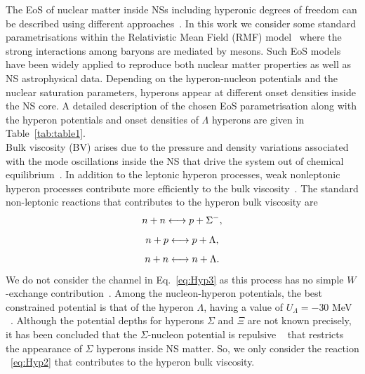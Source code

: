 \documentclass[%
 reprint,
 amsmath,amssymb,
 aps,
]{revtex4-2}
\begin{document}
 The EoS of nuclear matter inside NSs including hyperonic degrees of freedom can be described using different approaches~\cite{Chatterjee_2016,Oertel2017}. In this work we consider some standard parametrisations within the Relativistic Mean Field (RMF) model~\cite{GM91,Chen2014} where the strong interactions among baryons are mediated by mesons. Such EoS models have been widely applied to reproduce both nuclear matter properties as well as NS astrophysical data. Depending on the hyperon-nucleon potentials and the nuclear saturation parameters, hyperons appear at different onset densities inside the NS core. A detailed description of the chosen EoS parametrisation along with the hyperon potentials and onset densities of $\Lambda$ hyperons are given in Table~\ref{tab:table1}. \\

Bulk viscosity (BV) arises due to the pressure and density variations  associated  with the mode  oscillations inside the NS that  drive  the system out of chemical equilibrium~\cite{Jones2001}. 
In addition to the leptonic hyperon processes, weak nonleptonic hyperon processes  contribute  more  efficiently to the bulk viscosity~\cite{Jones2001,Lindblom2002}. The standard non-leptonic reactions that contributes to the hyperon bulk viscosity are 
\begin{equation}\label{eq:Hyp1}
    \centering
    n + n \longleftrightarrow p + \Sigma^{-},
\end{equation}
\begin{equation}\label{eq:Hyp2}
    \centering
    n + p \longleftrightarrow p + \Lambda ,
\end{equation}
\begin{equation}\label{eq:Hyp3}
    \centering
    n + n \longleftrightarrow n + \Lambda .
\end{equation}
We do not consider the channel in Eq.~\eqref{eq:Hyp3} as this process has no simple $W$-exchange  contribution~\cite{Lindblom2002}. Among the nucleon-hyperon potentials, the best constrained potential is that of the hyperon $\Lambda$, having a value of $U_{\Lambda}=-30$ MeV ~\cite{Millener88,Schaffner92}. Although the potential depths for hyperons $\Sigma$ and $\Xi$ are not known precisely, it has been concluded that the $\Sigma$-nucleon potential is repulsive ~\cite{FriedmanGal07,SchaffnerGal00,Mares951} that restricts the appearance of $\Sigma$ hyperons inside NS matter. So, we only consider the reaction ~\eqref{eq:Hyp2} that contributes to the hyperon bulk viscosity. \\
\end{document}
